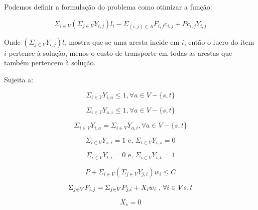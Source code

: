 \documentclass[conference]{IEEEtran}
\begin{document}
    Podemos definir a formulação do problema como otimizar a função:

    \begin{equation}
        \Sigma_{i \in V} (\Sigma_{j \in V} Y_{i,j}) l_i - \Sigma_{(i,j) \in A} F_{i,j}c_{i,j} + P c_{i,j} Y_{i,j}
    \end{equation}

    Onde $(\Sigma_{j \in V} Y_{i,j}) l_i$ mostra que se uma aresta incide em $i$, então o lucro do item $i$ pertence à solução, menos o custo de transporte em todas as arestas que também pertencem à solução.

    Sujeita a:

    \begin{equation}
        \Sigma_{i \in V} Y_{i,a} \leq 1, \forall a \in V - \{s,t\}
        \label{1}
    \end{equation}

    \begin{equation}
        \Sigma_{i \in V} Y_{a,i} \leq 1, \forall a \in V - \{s,t\}
        \label{2}
    \end{equation}

    \begin{equation}
        \Sigma_{i \in V} Y_{i,a} = \Sigma_{i \in V} Y_{a,i}, \forall a \in V - \{s,t\}
        \label{no-cicle}
    \end{equation}

    \begin{equation}
        \Sigma_{i \in V} Y_{s,i} = 1 \text{  e,  }  \Sigma_{i \in V} Y_{i,s} = 0
        \label{s}
    \end{equation}

    \begin{equation}
        \Sigma_{i \in V} Y_{t,i} = 0 \text{  e,  } \Sigma_{i \in V} Y_{i,t} = 1
        \label{t}
    \end{equation}

    \begin{equation}
        P + \Sigma_{i \in  V} (\Sigma_{j \in V} Y_{j,i}) w_i \leq C
        \label{capacity}
    \end{equation}

    \begin{equation}
        \Sigma_{j \in V}F_{i,j} = \Sigma_{j \in V} P_{j,i} + X_i w_i \text{ , } \forall i \in V \\ {s,t}
        \label{belong}
    \end{equation}

    \begin{equation}
        X_s = 0
        \label{ps}
    \end{equation}
\end{document}
